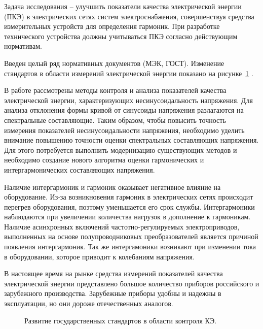Задача исследования -- улучшить показатели качества электрической энергии (ПКЭ) в электрических сетях систем электроснабжения, совершенствуя средства измерительных устройств для определения гармоник. При разработке технического устройства должны учитываться ПКЭ  согласно действующим нормативам. 

Введен целый ряд нормативных документов (МЭК, ГОСТ). Изменение стандартов в области измерений электрической энергии показано на рисунке~\ref{img:picture1} \cite{GOST30804.4.30-2013, GOST30804.4.7-2013, GOST32144-2013, GOST R8.655-2009, GOSTR51317.4.15-2012,GOST33073-2014,GOST8.622-2013}. 

В работе рассмотрены методы контроля и анализа показателей качества электрической энергии, характеризующих несинусоидальность напряжения. Для анализа отклонения формы кривой от синусоиды напряжения разлагаются на спектральные составляющие. Таким образом, чтобы повысить точность измерения показателей несинусоидальности напряжения, необходимо уделить внимание повышению точности оценки спектральных составляющих напряжения. Для этого потребуется выполнить модернизацию существующих методов и необходимо создание нового алгоритма оценки гармонических и интергармонических составляющих напряжения. 


Наличие интергармоник и гармоник оказывает негативное влияние на оборудование. Из-за возникновения гармоник в электрических сетях происходит перегрев оборудования, поэтому уменьшается его срок службы. Интергармоники наблюдаются при увеличении количества нагрузок в дополнение к гармоникам. Наличие асинхронных включений частотно-регулируемых электроприводов, выполненных на основе полупроводниковых преобразователей является причиной появления интергармоник. Так же интергамоники возникают при изменении тока в оборудовании, которое приводит к колебаниям напряжения. 

В настоящее время на рынке средства измерений показателей качества электрической энергии представлено большое количество приборов российского и зарубежного производства. Зарубежные приборы удобны и надежны в эксплуатации, но они дороже отечественных аналогов.

\begin{figure}[ht]
	\caption{Развитие государственных стандартов в области контроля КЭ.}\label{img:picture1}
\end{figure}


